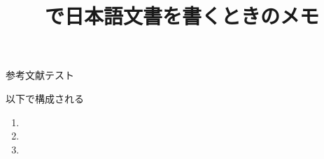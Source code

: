 \documentclass[a4paper,xelatex,10pt,ja=standard]{bxjsarticle}
\title{{\XeLaTeX}で日本語文書を書くときのメモ}
\begin{document}
\maketitle

参考文献テスト\cite{test}

以下で構成される

\begin{enumerate}
  \item {}
  \item {}
  \item {}
\end{enumerate}






\setlength{\bibsep}{3pt}

\end{document}
